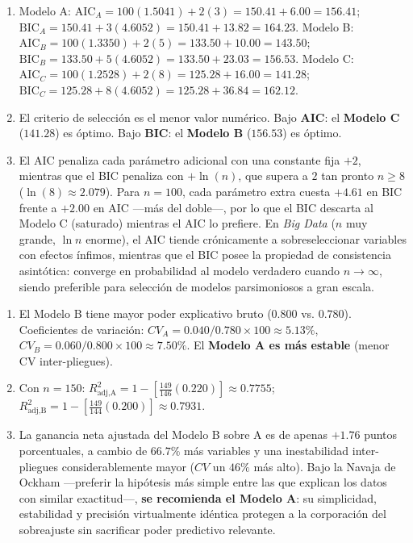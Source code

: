 \begin{solproblema}[prob:cb39746]
	\begin{enumerate}
		\item Modelo A: $\text{AIC}_A=100(1.5041)+2(3)=150.41+6.00=156.41$; $\text{BIC}_A=150.41+3(4.6052)=150.41+13.82=164.23$.
		Modelo B: $\text{AIC}_B=100(1.3350)+2(5)=133.50+10.00=143.50$; $\text{BIC}_B=133.50+5(4.6052)=133.50+23.03=156.53$.
		Modelo C: $\text{AIC}_C=100(1.2528)+2(8)=125.28+16.00=141.28$; $\text{BIC}_C=125.28+8(4.6052)=125.28+36.84=162.12$.
		\item El criterio de selección es el menor valor numérico. Bajo \textbf{AIC}: el \textbf{Modelo C} ($141.28$) es óptimo. Bajo \textbf{BIC}: el \textbf{Modelo B} ($156.53$) es óptimo.
		\item El AIC penaliza cada parámetro adicional con una constante fija $+2$, mientras que el BIC penaliza con $+\ln(n)$, que supera a $2$ tan pronto $n\ge8$ ($\ln(8)\approx2.079$). Para $n=100$, cada parámetro extra cuesta $+4.61$ en BIC frente a $+2.00$ en AIC —más del doble—, por lo que el BIC descarta al Modelo C (saturado) mientras el AIC lo prefiere. En \emph{Big Data} ($n$ muy grande, $\ln n$ enorme), el AIC tiende crónicamente a sobreseleccionar variables con efectos ínfimos, mientras que el BIC posee la propiedad de consistencia asintótica: converge en probabilidad al modelo verdadero cuando $n\to\infty$, siendo preferible para selección de modelos parsimoniosos a gran escala.
	\end{enumerate}
\end{solproblema}

\begin{solproblema}[prob:2b2e597]
	\begin{enumerate}
		\item El Modelo B tiene mayor poder explicativo bruto ($0.800$ vs. $0.780$). Coeficientes de variación: $CV_A=0.040/0.780\times100\approx5.13\%$, $CV_B=0.060/0.800\times100\approx7.50\%$. El \textbf{Modelo A es más estable} (menor CV inter-pliegues).
		\item Con $n=150$: $R_{\text{adj,A}}^2 = 1-\left[\frac{149}{146}(0.220)\right]\approx0.7755$; $R_{\text{adj,B}}^2 = 1-\left[\frac{149}{144}(0.200)\right]\approx0.7931$.
		\item La ganancia neta ajustada del Modelo B sobre A es de apenas $+1.76$ puntos porcentuales, a cambio de $66.7\%$ más variables y una inestabilidad inter-pliegues considerablemente mayor ($CV$ un $46\%$ más alto). Bajo la Navaja de Ockham —preferir la hipótesis más simple entre las que explican los datos con similar exactitud—, \textbf{se recomienda el Modelo A}: su simplicidad, estabilidad y precisión virtualmente idéntica protegen a la corporación del sobreajuste sin sacrificar poder predictivo relevante.
	\end{enumerate}
\end{solproblema}

